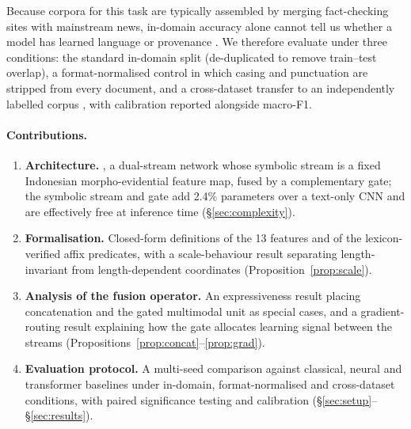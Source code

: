 Because corpora for this task are typically assembled by merging fact-checking sites with mainstream news,
in-domain accuracy alone cannot tell us whether a model has learned language or provenance
\citep{gururangan2018annotation,geirhos2020shortcut}. We therefore evaluate under three conditions: the
standard in-domain split (de-duplicated to remove train--test overlap), a format-normalised control in
which casing and punctuation are stripped from every document, and a cross-dataset transfer to an
independently labelled corpus \citep{pratiwi2017hoax}, with calibration reported alongside macro-F1.

\paragraph{Contributions.}
\begin{enumerate}\itemsep1pt
\item \textbf{Architecture.} \menet{}, a dual-stream network whose symbolic stream is a fixed
Indonesian morpho-evidential feature map, fused by a complementary gate; the symbolic stream and gate add
2.4\% parameters over a text-only CNN and are effectively free at inference time (\S\ref{sec:complexity}).
\item \textbf{Formalisation.} Closed-form definitions of the 13 features and of the lexicon-verified affix
predicates, with a scale-behaviour result separating length-invariant from length-dependent coordinates
(Proposition~\ref{prop:scale}).
\item \textbf{Analysis of the fusion operator.} An expressiveness result placing concatenation and the
gated multimodal unit as special cases, and a gradient-routing result explaining how the gate allocates
learning signal between the streams (Propositions~\ref{prop:concat}--\ref{prop:grad}).
\item \textbf{Evaluation protocol.} A multi-seed comparison against classical, neural and transformer
baselines under in-domain, format-normalised and cross-dataset conditions, with paired significance
testing and calibration (\S\ref{sec:setup}--\S\ref{sec:results}).
\end{enumerate}
